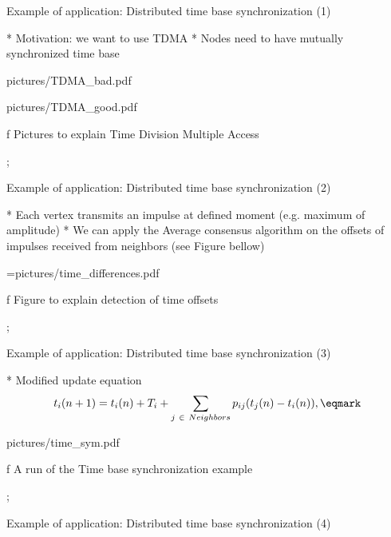 


\sec Example of application: \nl  Distributed time base synchronization (1)



* Motivation: we want to use TDMA
* Nodes need to have mutually synchronized time base



\centerline{\picw=11cm \inspic pictures/TDMA_bad.pdf } 
\centerline{\picw=11cm \inspic pictures/TDMA_good.pdf } 
\caption/f Pictures to explain Time Division Multiple Access

\pg;






\sec Example of application: \nl  Distributed time base synchronization  (2)

* Each vertex transmits an impulse at defined moment (e.g. maximum of amplitude)
* We can apply the Average consensus algorithm  on the offsets of impulses received from neighbors (see Figure bellow) 


\centerline{\picw=\hsize \inspic pictures/time_differences.pdf } 
\caption/f Figure to explain detection of time offsets

\pg;





\sec Example of application: \nl  Distributed time base synchronization (3)

* Modified update equation
$$ t_i(n+1) = t_i(n)+T_i+ \sum_{j \ \in  \ Neighbors} p_{ij}(t_j(n) - t_i(n)), \eqmark$$

\centerline{\hsize \inspic pictures/time_sym.pdf }

\caption/f A run of the Time base synchronization example




\pg;

\sec Example of application: \nl  Distributed time base synchronization (4)


